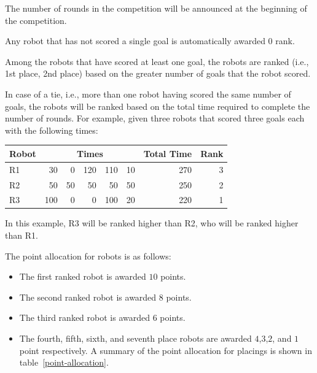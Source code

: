 \documentclass[12pt]{hurocup}
\begin{document}
\begin{lawlist}[PK]

\item The number of rounds in the competition will be announced at the
  beginning of the competition.

\item Any robot that has not scored a single goal is automatically
  awarded 0 rank.

\item Among the robots that have scored at least one goal, the robots
  are ranked (i.e., 1st place, 2nd place) based on the greater number
  of goals that the robot scored.

\item In case of a tie, i.e., more than one robot having scored the
  same number of goals, the robots will be ranked based on the total
  time required to complete the number of rounds. For example, given
  three robots that scored three goals each with the following times:

      \begin{center}
        \begin{tabular}{l|rrrrr|r|r|}
          \hline
          Robot & \multicolumn{5}{c}{Times} & Total Time & Rank \\
          \hline
          R1 & 30 & 0 & 120 & 110 & 10 & 270 & 3 \\
          R2 & 50 & 50 & 50 & 50 & 50 & 250 & 2 \\
          R3 & 100 & 0 & 0 & 100 & 20 & 220 & 1 \\
          \hline
        \end{tabular}
      \end{center}

  In this example, R3 will be ranked higher than R2, who will be
  ranked higher than R1.

\item The point allocation for robots is as follows:
  \begin{itemize}
  \item The first ranked robot is awarded $10$ points.
  \item The second ranked robot is awarded $8$ points.
  \item The third ranked robot is awarded $6$ points.
  \item The fourth, fifth, sixth, and seventh place robots are awarded
    $4$,$3$,$2$, and $1$ point respectively.  A summary of the point
    allocation for placings is shown in table~\ref{point-allocation}.


\end{itemize}
\end{lawlist}
\end{document}
